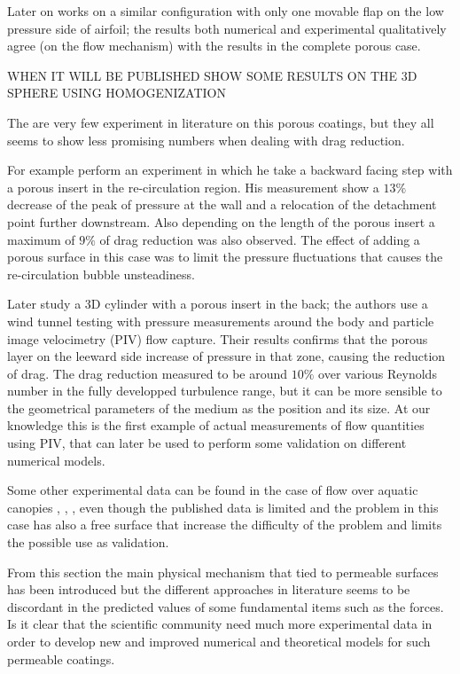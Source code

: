 Later on \citet{rosti2017pelskin} works on a similar configuration with only one movable flap on the low pressure side of airfoil; the results both numerical and experimental qualitatively agree (on the flow mechanism) with the results in the complete porous case.


WHEN IT WILL BE PUBLISHED SHOW SOME RESULTS ON THE 3D SPHERE USING HOMOGENIZATION \citet{zampogna2017new}

The are very few experiment in literature on this porous coatings, but they all seems to show less promising numbers when  dealing with drag reduction.

For example \citet{heenan1998passive} perform an experiment in which he take a backward facing step with a porous insert in the re-circulation region.
His measurement show a $13\%$ decrease of the peak of pressure at the wall and a relocation of the detachment point further downstream.
Also depending on the length of the porous insert a maximum of $9\%$ of drag reduction was also observed.
The effect of adding a porous surface in this case was to limit the pressure fluctuations that causes the re-circulation bubble unsteadiness.

Later \citet{klausmann2017drag} study a 3D cylinder with a porous insert in the back; the authors use a wind tunnel testing with pressure measurements around the body and particle image velocimetry (PIV) flow capture.
Their results confirms that the porous layer on the leeward side increase of pressure in that zone, causing the reduction of drag.
The drag reduction measured to be around $10\%$ over various Reynolds number in the fully developped turbulence range, but it can be more sensible to the geometrical parameters of the medium as the position and its size.
At our knowledge this is the first example of actual measurements of flow quantities using PIV, that can later be used to perform some validation on different numerical models.

Some other experimental data can be found in the case of flow over aquatic canopies \citet{zhang2011exchange}, \citet{segalini2011experimental}, \citet{hamed2017impact}, even though the published data is limited and the problem in this case has also a free surface that increase the difficulty of the problem and limits the possible use as validation.

From this section the main physical mechanism that tied to permeable surfaces has been introduced but the different approaches in literature seems to be discordant in the predicted values of some fundamental items such as the forces.
Is it clear that the scientific community need much more experimental data in order to develop new and improved numerical and theoretical models for such permeable coatings.

